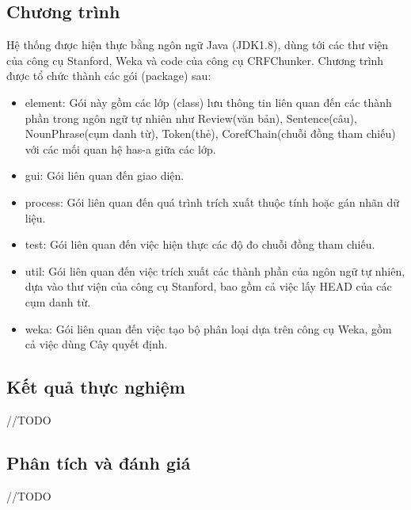 \documentclass[12pt]{extarticle}
\begin{document}
		\subsection{Chương trình}
			\par Hệ thống được hiện thực bằng ngôn ngữ Java (JDK1.8), dùng tới các thư viện của công cụ Stanford, Weka và code của công cụ CRFChunker. Chương trình được tổ chức thành các gói (package) sau:
			\begin{itemize}
				\item{element: Gói này gồm các lớp (class) lưu thông tin liên quan đến các thành phần trong ngôn ngữ tự nhiên như Review(văn bản), Sentence(câu), NounPhrase(cụm danh từ), Token(thẻ), CorefChain(chuỗi đồng tham chiếu) với các mối quan hệ has-a giữa các lớp.}
				\item{gui: Gói liên quan đến giao diện.}
				\item{process: Gói liên quan đến quá trình trích xuất thuộc tính hoặc gán nhãn dữ liệu.}
				\item{test: Gói liên quan đến việc hiện thực các độ đo chuỗi đồng tham chiếu.}
				\item{util: Gói liên quan đến việc trích xuất các thành phần của ngôn ngữ tự nhiên, dựa vào thư viện của công cụ Stanford, bao gồm cả việc lấy HEAD của các cụm danh từ.}
				\item{weka: Gói liên quan đến việc tạo bộ phân loại dựa trên công cụ Weka, gồm cả việc dùng Cây quyết định.}
			\end{itemize}

		\subsection{Kết quả thực nghiệm}
			//TODO
		\subsection{Phân tích và đánh giá}			
			//TODO
\end{document}
